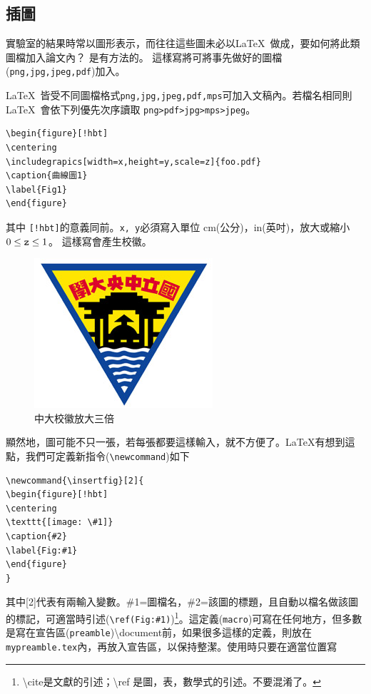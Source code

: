 \subsection{插圖}
實驗室的結果時常以圖形表示，而往往這些圖未必以\LaTeX\ 做成，要如何將此類圖檔加入論文內？ 是有方法的。 這樣寫將可將事先做好的圖檔({\tt png,jpg,jpeg,pdf})加入。 

\LaTeX\ 皆受不同圖檔格式{\tt png,jpg,jpeg,pdf,mps}可加入文稿內。若檔名相同則\LaTeX\ 會依下列優先次序讀取
{\tt png>pdf>jpg>mps>jpeg}。\\
\begin{Verbatim}[frame=single,firstline=1,label=Every figure]
\begin{figure}[!hbt]
\centering
\includegrapics[width=x,height=y,scale=z]{foo.pdf}  
\caption{曲線圖1}
\label{Fig1}
\end{figure}
\end{Verbatim}
其中 {\tt[!hbt]}的意義同前。{\tt x, y}必須寫入單位 cm(公分)，in(英吋)，放大或縮小 $0 \le {\tt z} \le 1$。
這樣寫會產生校徽。
\begin{figure}[!hbt]
\centering
\includegraphics[scale=3]{NCUlogo} 
\caption{中大校徽放大三倍}
\label{Fig1}
\end{figure}%
顯然地，圖可能不只一張，若每張都要這樣輸入，就不方便了。\LaTeX{}有想到這點，我們可定義新指令({\tt \textbackslash newcommand})如下\\
\begin{Verbatim}[frame=single,firstline=1,label={Macro with parameters}]
\newcommand{\insertfig}[2]{
\begin{figure}[!hbt]
\centering
\texttt{[image: \#1]}
\caption{#2}
\label{Fig:#1}
\end{figure}
}
\end{Verbatim}
其中[2]代表有兩輸入變數。\#1=圖檔名，\#2=該圖的標題，且自動以檔名做該圖的標記，可適當時引述({\tt \textbackslash ref(Fig:\#1)})\footnote{\textbackslash cite是文獻的引述；\textbackslash ref 是圖，表，數學式的引述。不要混淆了。}。這定義({\tt macro})可寫在任何地方，但多數是寫在宣告區({\tt preamble})\textbackslash document前，如果很多這樣的定義，則放在{\tt mypreamble.tex}內，再放入宣告區，以保持整潔。使用時只要在適當位置寫
